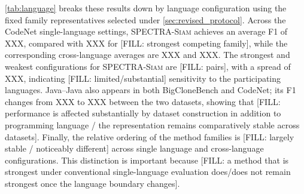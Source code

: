 \documentclass[final,5p,times,twocolumn]{elsarticle}
\newcommand{\method}{\textsc{SPECTRA-Siam}}
\theoremstyle{plain}
\begin{document}
\autoref{tab:language} breaks these results down by language configuration using the fixed family representatives selected under
\autoref{sec:revised_protocol}. Across the CodeNet single-language settings, \method{} achieves an average F1 of XXX, compared with XXX for [FILL: strongest competing family], while the corresponding cross-language averages are XXX and XXX. The strongest and weakest configurations for \method{} are [FILL: pairs], with a spread of XXX, indicating [FILL: limited/substantial] sensitivity to the participating languages. Java--Java also appears in both BigCloneBench and CodeNet; its F1 changes from XXX to XXX between the two datasets, showing that [FILL: performance is affected substantially by dataset construction in addition to programming language / the representation remains comparatively stable across datasets]. Finally, the relative ordering of the method families is [FILL: largely stable / noticeably different] across single language and cross-language configurations. This distinction is important because [FILL: a method that is strongest under conventional single-language evaluation does/does not remain strongest once the language boundary changes].
\end{document}
